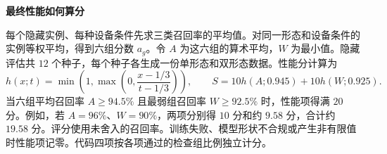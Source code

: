 \documentclass[11pt,a4paper]{article}
\newcommand{\task}[1]{\par\smallskip\noindent\textbf{#1}\par}
\begin{document}
\task{最终性能如何算分}
每个隐藏实例、每种设备条件先求三类召回率的平均值。对同一形态和设备条件的实例等权平均，得到六组分数 $a_g$。令 $A$ 为这六组的算术平均，$W$ 为最小值。隐藏评估共 $12$ 个种子，每个种子各生成一份单形态和双形态数据。性能分计算为
\[
 h(x;t)=\min\!\left(1,\max\!\left(0,\frac{x-1/3}{t-1/3}\right)\right),
 \qquad S=10h(A;0.945)+10h(W;0.925).
\]
当六组平均召回率 $A\geq94.5\%$ 且最弱组召回率 $W\geq92.5\%$ 时，性能项得满 $20$ 分。例如，若 $A=96\%$、$W=90\%$，两项分别得 $10$ 分和约 $9.58$ 分，合计约 $19.58$ 分。评分使用未舍入的召回率。训练失败、模型形状不合规或产生非有限值时性能项记零。代码四项按各项通过的检查组比例独立计分。

\ifdefined\Teacher
  \clearpage
\fi
\end{document}
